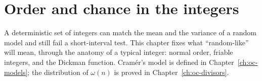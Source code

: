 \chapter{Order and chance in the integers}\label{ch:oc-integers}\label{ch:anatomy}

A deterministic set of integers can match the mean and the variance of a random model and still fail a short-interval test. This chapter fixes what ``random-like'' will mean, through the anatomy of a typical integer: normal order, friable integers, and the Dickman function. Cram\'er's model is defined in Chapter~\ref{ch:oc-models}; the distribution of $\omega(n)$ is proved in Chapter~\ref{ch:oc-divisors}.


